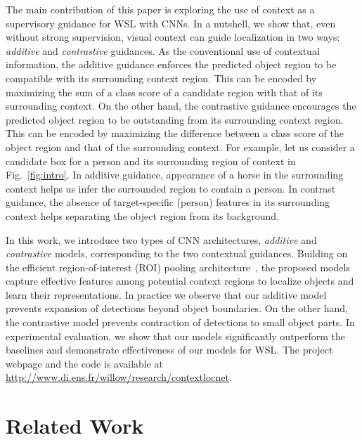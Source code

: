 \documentclass[runningheads]{llncs}
\begin{document}
The main contribution of this paper is exploring the use of context as a
supervisory guidance for WSL with CNNs. In a nutshell, we show that, even without strong
supervision, visual context can guide localization in two ways: {\it additive
} and {\it contrastive} guidances.  As the conventional use of contextual
information, the additive guidance enforces the predicted object region to be
compatible with its surrounding context region. This can be encoded by
maximizing the sum of a class score of a candidate region with that of its
surrounding context.
On the other hand, the contrastive guidance encourages the
predicted object region to be outstanding from its surrounding context region.
This can be encoded by maximizing the difference between a class score of the
object region and that of the surrounding context. For example, let us consider a candidate box for a person and its surrounding
region of context in Fig.~\ref{fig:intro}. In additive guidance,
appearance of a horse in the surrounding context helps us infer the
surrounded region to contain a person. In contrast guidance, the absence of
target-specific (person) features in its surrounding context helps 
separating the object region from its background.



In this work, we introduce two types of CNN architectures, {\it additive} and
{\it contrastive} models, corresponding to the two contextual guidances. 
Building on the efficient region-of-interest (ROI) pooling
architecture~\cite{ren15fasterrcnn}, the proposed models capture effective
features among potential context regions to localize objects and learn their
representations.
In practice we observe that our additive model prevents expansion of detections
beyond object boundaries. On the other hand, the contrastive model prevents
contraction of detections to small object parts.
In experimental evaluation, we show that our models
significantly outperform the baselines and demonstrate effectiveness of our models for WSL. The project webpage and the code is available at \url{http://www.di.ens.fr/willow/research/contextlocnet}. 
\section{Related Work}
\end{document}
